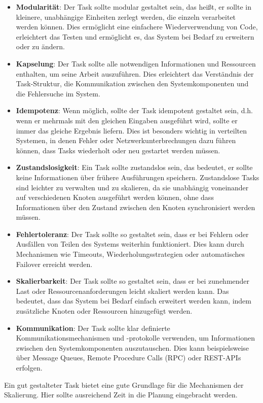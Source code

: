 \documentclass[../vs-script-first-v01.tex]{subfiles}
\begin{document}
\begin{itemize}
\item \textbf{Modularität}: Der Task sollte modular gestaltet sein, das heißt, er sollte in kleinere, unabhängige Einheiten zerlegt werden, die einzeln verarbeitet werden können. Dies ermöglicht eine einfachere Wiederverwendung von Code, erleichtert das Testen und ermöglicht es, das System bei Bedarf zu erweitern oder zu ändern.
\item \textbf{Kapselung}: Der Task sollte alle notwendigen Informationen und Ressourcen enthalten, um seine Arbeit auszuführen. Dies erleichtert das Verständnis der Task-Struktur, die Kommunikation zwischen den Systemkomponenten und die Fehlersuche im System.
\item \textbf{Idempotenz}: Wenn möglich, sollte der Task idempotent gestaltet sein, d.h. wenn er mehrmals mit den gleichen Eingaben ausgeführt wird, sollte er immer das gleiche Ergebnis liefern. Dies ist besonders wichtig in verteilten Systemen, in denen Fehler oder Netzwerkunterbrechungen dazu führen können, dass Tasks wiederholt oder neu gestartet werden müssen.
\item \textbf{Zustandslosigkeit}: Ein Task sollte zustandslos sein, das bedeutet, er sollte keine Informationen über frühere Ausführungen speichern. Zustandslose Tasks sind leichter zu verwalten und zu skalieren, da sie unabhängig voneinander auf verschiedenen Knoten ausgeführt werden können, ohne dass Informationen über den Zustand zwischen den Knoten synchronisiert werden müssen.
\item \textbf{Fehlertoleranz}: Der Task sollte so gestaltet sein, dass er bei Fehlern oder Ausfällen von Teilen des Systems weiterhin funktioniert. Dies kann durch Mechanismen wie Timeouts, Wiederholungsstrategien oder automatisches Failover erreicht werden.
\item \textbf{Skalierbarkeit}: Der Task sollte so gestaltet sein, dass er bei zunehmender Last oder Ressourcenanforderungen leicht skaliert werden kann. Das bedeutet, dass das System bei Bedarf einfach erweitert werden kann, indem zusätzliche Knoten oder Ressourcen hinzugefügt werden.
\item \textbf{Kommunikation}: Der Task sollte klar definierte Kommunikationsmechanismen und -protokolle verwenden, um Informationen zwischen den Systemkomponenten auszutauschen. Dies kann beispielsweise über Message Queues, Remote Procedure Calls (RPC) oder REST-APIs erfolgen.
\end{itemize}
Ein gut gestalteter Task bietet eine gute Grundlage für die Mechanismen der Skalierung. Hier sollte ausreichend Zeit in die Planung eingebracht werden.
\end{document}
